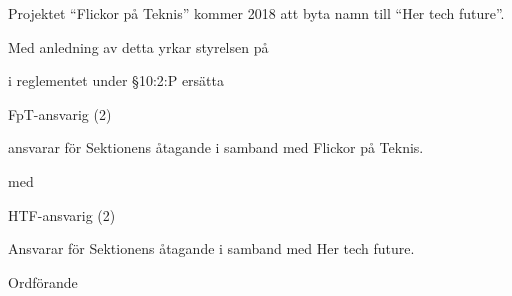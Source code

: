 \documentclass[../_main/handlingar.tex]{subfiles}
\begin{document}
Projektet ``Flickor på Teknis'' kommer 2018 att byta namn till ``Her tech future''.

Med anledning av detta yrkar styrelsen på
\begin{attsatser}
    \att i reglementet under \S10:2:P ersätta\par
        FpT-ansvarig (2)
        \begin{tightdashlist}
            \item ansvarar för Sektionens åtagande i samband med Flickor på Teknis.
        \end{tightdashlist}
        med

          HTF-ansvarig (2)
          \begin{tightdashlist}
              \item Ansvarar för Sektionens åtagande i samband med Her tech future.
          \end{tightdashlist}
\end{attsatser}

\begin{signatures}{1}
    \ist
    \signature{\ordf}{Ordförande}
\end{signatures}
\end{document}
